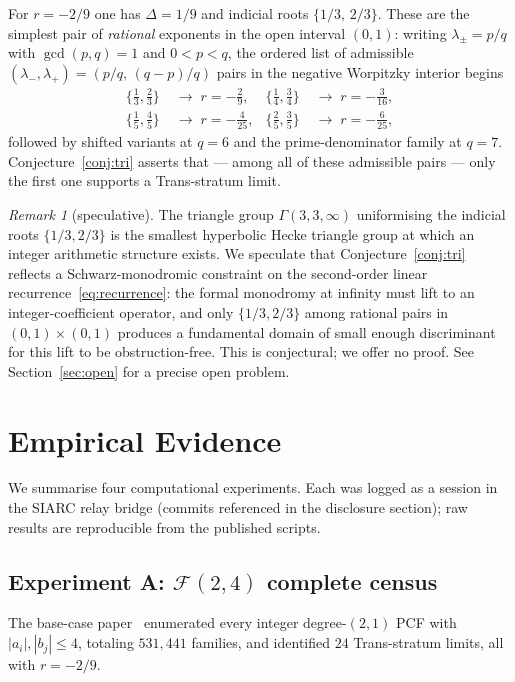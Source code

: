 \documentclass[11pt]{amsart}
\theoremstyle{definition}
\theoremstyle{remark}
\newtheorem{remark}[theorem]{Remark}
\newcommand{\FF}{\mathcal{F}}
\begin{document}
For $r = -2/9$ one has $\Delta = 1/9$ and indicial roots
$\{1/3,\,2/3\}$.  These are the simplest pair of \emph{rational}
exponents in the open interval $(0,1)$: writing $\lambda_\pm = p/q$
with $\gcd(p,q) = 1$ and $0 < p < q$, the ordered list of admissible
$(\lambda_-, \lambda_+) = (p/q,\,(q-p)/q)$ pairs in the negative
Worpitzky interior begins
\begin{align*}
  \{\tfrac{1}{3},\tfrac{2}{3}\} &\;\to\; r = -\tfrac{2}{9}, &
  \{\tfrac{1}{4},\tfrac{3}{4}\} &\;\to\; r = -\tfrac{3}{16}, \\
  \{\tfrac{1}{5},\tfrac{4}{5}\} &\;\to\; r = -\tfrac{4}{25}, &
  \{\tfrac{2}{5},\tfrac{3}{5}\} &\;\to\; r = -\tfrac{6}{25},
\end{align*}
followed by shifted variants at $q = 6$ and the prime-denominator
family at $q = 7$.  Conjecture~\ref{conj:tri} asserts that --- among
all of these admissible pairs --- only the first one supports a
Trans-stratum limit.

\begin{remark}[speculative]
\label{rem:schwarz-speculation}
The triangle group $\Gamma(3,3,\infty)$ uniformising the indicial
roots $\{1/3, 2/3\}$ is the smallest hyperbolic Hecke triangle group
at which an integer arithmetic structure exists.  We speculate that
Conjecture~\ref{conj:tri} reflects a Schwarz-monodromic constraint
on the second-order linear recurrence~\eqref{eq:recurrence}: the
formal monodromy at infinity must lift to an integer-coefficient
operator, and only $\{1/3,2/3\}$ among rational pairs in $(0,1) \times
(0,1)$ produces a fundamental domain of small enough discriminant for
this lift to be obstruction-free.  This is conjectural; we offer no
proof.  See Section~\ref{sec:open} for a precise open problem.
\end{remark}

\section{Empirical Evidence}\label{sec:evidence}

We summarise four computational experiments.  Each was logged as a
session in the SIARC relay bridge (commits referenced in the
disclosure section); raw results are reproducible from the published
scripts.

\subsection*{Experiment A: $\FF(2,4)$ complete census}
The base-case paper~\cite{PCF25} enumerated every integer
degree-$(2,1)$ PCF with $|a_i|, |b_j| \le 4$, totaling $531{,}441$
families, and identified $24$ Trans-stratum limits, all with
$r = -2/9$.
\end{document}
